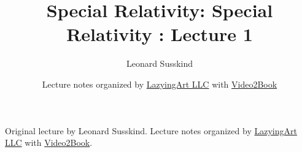 \documentclass[11pt,oneside]{book}
\begin{document}
\frontmatter
\title{Special Relativity: Special Relativity : Lecture 1}
\author{Leonard Susskind}
\date{Lecture notes organized by \href{https://lazying.art}{LazyingArt LLC} with \href{https://github.com/lachlanchen/Video2Book}{Video2Book}}
\maketitle
\begin{center}
\small Original lecture by Leonard Susskind. Lecture notes organized by \href{https://lazying.art}{LazyingArt LLC} with \href{https://github.com/lachlanchen/Video2Book}{Video2Book}.
\end{center}
\clearpage
\mainmatter

\end{document}
